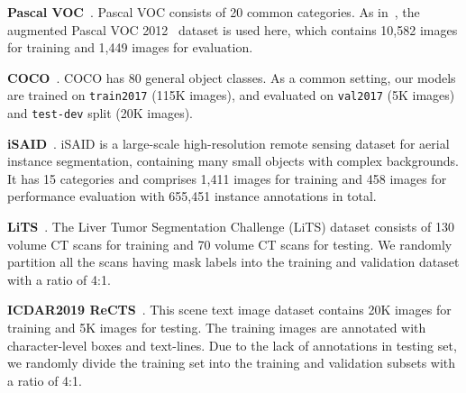 \documentclass[12pt,onecolumn,letterpaper]{article}
\begin{document}
\textbf{Pascal VOC}~\cite{pascalvoc2010}. Pascal VOC consists of 20 common categories. As in~\cite{nips2019-bbtp, cvpr2021_boxinst, iccv2021discobox}, the augmented Pascal VOC 2012~\cite{iccv2011_SBDdataset} dataset is used here, which contains 10,582 images for training and 1,449 images for evaluation. 

\textbf{COCO}~\cite{lin2014microsoft}. COCO has 80 general object classes. As a common setting, our models are trained on \texttt{train2017} (115K images), and evaluated on \texttt{val2017} (5K images) and \texttt{test-dev} split (20K images).

\textbf{iSAID}~\cite{cvpr2019isaid}. iSAID is a large-scale high-resolution remote sensing dataset for aerial instance segmentation, containing many small objects with complex backgrounds. It has 15 categories and comprises 1,411 images for training and 458 images for performance evaluation with 655,451 instance annotations in total. 

\textbf{LiTS}~\cite{bilic2019lits}. The Liver Tumor Segmentation Challenge (LiTS) dataset consists of 130 volume CT scans for training and 70 volume CT scans for testing. We randomly partition all the scans having mask labels into the training and validation dataset with a ratio of 4:1.

\textbf{ICDAR2019 ReCTS}~\cite{zhang2019icdar}. This scene text image dataset contains 20K images for training and 5K images for testing. The training images are annotated with character-level boxes and text-lines. Due to the lack of annotations in testing set, we randomly divide the training set into the training and validation subsets with a ratio of 4:1.
\end{document}
